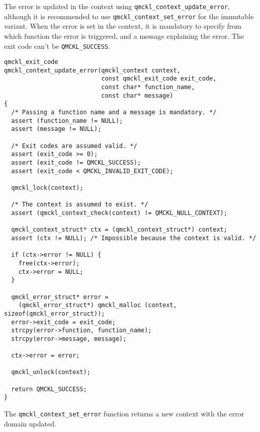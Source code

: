 The error is updated in the context using
\texttt{qmckl\_context\_update\_error}, although it is recommended to use
\texttt{qmckl\_context\_set\_error} for the immutable variant.
When the error is set in the context, it is mandatory to specify
from which function the error is triggered, and a message
explaining the error. The exit code can't be \texttt{QMCKL\_SUCCESS}.

\begin{verbatim}
qmckl_exit_code
qmckl_context_update_error(qmckl_context context,
                           const qmckl_exit_code exit_code,
                           const char* function_name,
                           const char* message)
{
  /* Passing a function name and a message is mandatory. */
  assert (function_name != NULL);
  assert (message != NULL);

  /* Exit codes are assumed valid. */
  assert (exit_code >= 0);
  assert (exit_code != QMCKL_SUCCESS);
  assert (exit_code < QMCKL_INVALID_EXIT_CODE);

  qmckl_lock(context);
  
  /* The context is assumed to exist. */
  assert (qmckl_context_check(context) != QMCKL_NULL_CONTEXT);

  qmckl_context_struct* ctx = (qmckl_context_struct*) context;
  assert (ctx != NULL); /* Impossible because the context is valid. */

  if (ctx->error != NULL) {
    free(ctx->error);
    ctx->error = NULL;
  }

  qmckl_error_struct* error =
    (qmckl_error_struct*) qmckl_malloc (context, sizeof(qmckl_error_struct));
  error->exit_code = exit_code;
  strcpy(error->function, function_name);
  strcpy(error->message, message);

  ctx->error = error;

  qmckl_unlock(context);
  
  return QMCKL_SUCCESS;
}
\end{verbatim}

The \texttt{qmckl\_context\_set\_error} function returns a new context with
the error domain updated.

